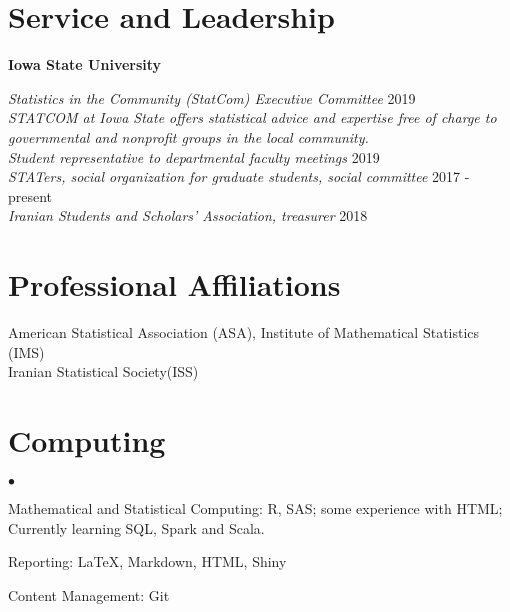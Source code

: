 \documentclass[margin,line]{res}
\newenvironment{list2}{
  \begin{list}{$\bullet$}{%
      \setlength{\itemsep}{0in}
      \setlength{\parsep}{0in} \setlength{\parskip}{0in}
      \setlength{\topsep}{0in} \setlength{\partopsep}{0in}
      \setlength{\leftmargin}{0.2in}}}{\end{list}}
\begin{document}
\begin{resume}
\section{\sc Service and Leadership}

{\bf Iowa State University}


{\em Statistics in the Community (StatCom) Executive Committee} \hfill { 2019}\\
{\em STATCOM at Iowa State offers statistical advice and expertise free of charge to governmental and nonprofit groups in the local community.}\\
{\em Student representative to departmental faculty meetings} \hfill { 2019 }\\
{\em STATers, social organization for graduate students, social committee} \hfill { 2017 - present}\\
{\em Iranian Students and Scholars' Association, treasurer} \hfill { 2018}



\section{\sc Professional Affiliations}
American Statistical Association (ASA), Institute of Mathematical Statistics (IMS)\\
Iranian Statistical Society(ISS)


\section{\sc Computing}
\begin{list2}
\newcommand{\latex}{\LaTeX\xspace}	
\item Mathematical and Statistical Computing:  R, SAS; some experience with HTML;\\
 Currently learning  SQL, Spark and Scala.
\item Reporting:  \LaTeX, Markdown, HTML, Shiny
\item Content Management: Git



\end{list2}











\end{resume}
\end{document}

